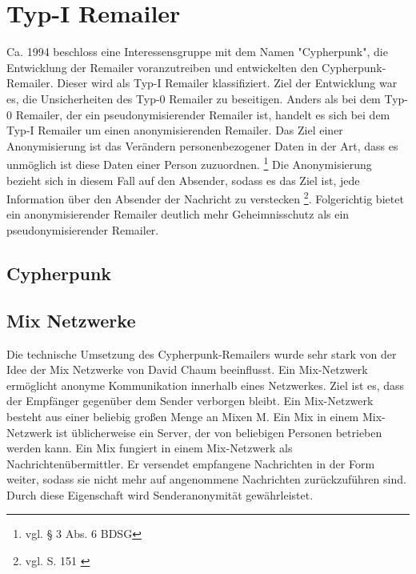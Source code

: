 \chapter{Typ-I Remailer}
Ca. 1994 beschloss eine Interessensgruppe mit dem Namen "Cypherpunk", die Entwicklung der Remailer voranzutreiben und entwickelten den Cypherpunk-Remailer. Dieser wird als Typ-I Remailer klassifiziert. Ziel der Entwicklung war es, die Unsicherheiten des Typ-0 Remailer zu beseitigen. 
Anders als bei dem Typ-0 Remailer, der ein pseudonymisierender Remailer ist, handelt es sich bei dem Typ-I Remailer um einen anonymisierenden Remailer. Das Ziel einer Anonymisierung ist das Verändern personenbezogener Daten in der Art, dass es unmöglich ist diese Daten einer Person zuzuordnen. \footnote {vgl. § 3 Abs. 6 BDSG}
Die Anonymisierung bezieht sich in diesem Fall auf den Absender, sodass es das Ziel ist, jede Information über den Absender der Nachricht zu verstecken \footnote{vgl. S. 151 \cite{horster2013datenschutz}}. Folgerichtig bietet ein anonymisierender Remailer deutlich mehr Geheimnisschutz als ein pseudonymisierender Remailer. 


\section{Cypherpunk}

\section{Mix Netzwerke}
Die technische Umsetzung des Cypherpunk-Remailers wurde sehr stark von der Idee der Mix Netzwerke von David Chaum beeinflusst. Ein Mix-Netzwerk ermöglicht anonyme Kommunikation innerhalb eines Netzwerkes. Ziel ist es, dass der Empfänger gegenüber dem Sender verborgen bleibt.
Ein Mix-Netzwerk besteht aus einer beliebig großen Menge an Mixen M. Ein Mix in einem Mix-Netzwerk ist üblicherweise ein Server, der von beliebigen Personen betrieben werden kann. Ein Mix fungiert in einem Mix-Netzwerk als Nachrichtenübermittler. Er versendet empfangene Nachrichten in der Form weiter, sodass sie nicht mehr auf angenommene Nachrichten zurückzuführen sind. Durch diese Eigenschaft wird Senderanonymität gewährleistet.

